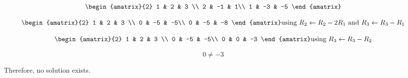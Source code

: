 \documentclass[11pt]{article}
\begin{document}
\begin{enumerate}[(a)]
    \begin{Answer}
		$$\begin{amatrix}{2}
   		1 & 2 & 3 \\  
		2 & -1 & 1\\
		1 & -3 & -5
		\end{amatrix}$$
		
		$$\begin{amatrix}{2}
   		1 & 2 & 3 \\  
		0 & -5 & -5\\
		0 & -5 & -8
		\end{amatrix} \text{using } R_2 \leftarrow R_2 - 2R_1 \text{ and }  R_3 \leftarrow R_3 - R_1$$
		
		$$\begin{amatrix}{2}
   		1 & 2 & 3 \\  
		0 & -5 & -5\\
		0 & 0 & -3
		\end{amatrix} \text{using } R_3 \leftarrow R_3 - R_2 $$
		
		$$0 \neq -3$$
		
		Therefore, no solution exists.
	\end{Answer}

\end{enumerate}
\end{document}
